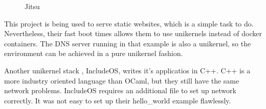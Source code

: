 \begin{figure}[h!]
\centering
\begin {sequencediagram}


\end {sequencediagram}
\caption{Jitsu \cite{jitsu}}\label{fig:jitsu}
\end{figure}

This project is being used to serve static websites, which is a simple task to do. Nevertheless, their fast boot times allows them to use unikernels instead of docker containers. The DNS server running in that example is also a unikernel, so the environment can be achieved in a pure unikernel fashion.

Another unikernel stack , IncludeOS, writes it's applicatios in C++. C++ is a more industry oriented language than OCaml, but they still have the same network problems. IncludeOS requires an additional file to set up network correctly. It was not easy to set up their hello\_world example flawlessly.